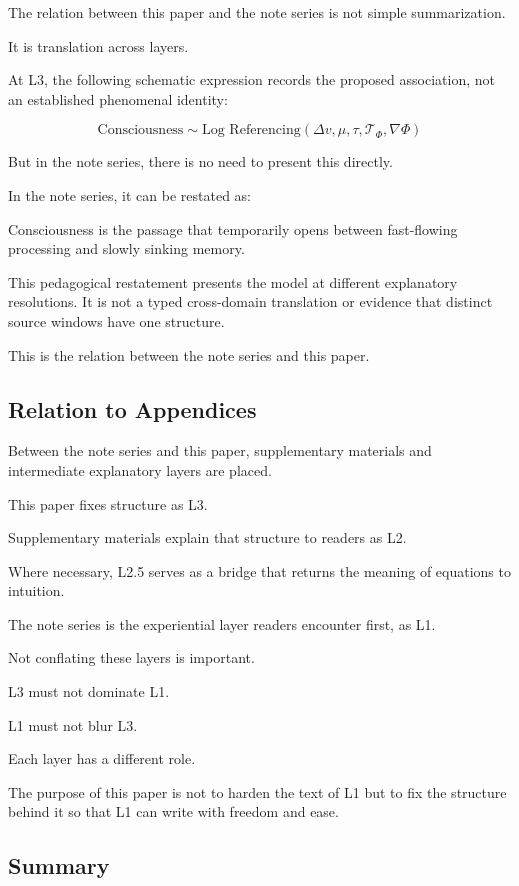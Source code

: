 The relation between this paper and the note series is not simple summarization.

It is translation across layers.

At L3, the following schematic expression records the proposed association, not an established phenomenal identity:

\begin{equation}
\text{Consciousness} \sim \text{Log Referencing}\!\left(\Delta v, \mu, \tau, \mathcal{T}_{\Phi}, \nabla\Phi\right)
\end{equation}

But in the note series, there is no need to present this directly.

In the note series, it can be restated as:

Consciousness is the passage that temporarily opens between fast-flowing processing and slowly sinking memory.

This pedagogical restatement presents the model at different explanatory resolutions. It is not a typed cross-domain translation or evidence that distinct source windows have one structure.

This is the relation between the note series and this paper.

\subsection{Relation to Appendices}


Between the note series and this paper, supplementary materials and intermediate explanatory layers are placed.

This paper fixes structure as L3.

Supplementary materials explain that structure to readers as L2.

Where necessary, L2.5 serves as a bridge that returns the meaning of equations to intuition.

The note series is the experiential layer readers encounter first, as L1.

Not conflating these layers is important.

L3 must not dominate L1.

L1 must not blur L3.

Each layer has a different role.

The purpose of this paper is not to harden the text of L1 but to fix the structure behind it so that L1 can write with freedom and ease.

\subsection{Summary}


